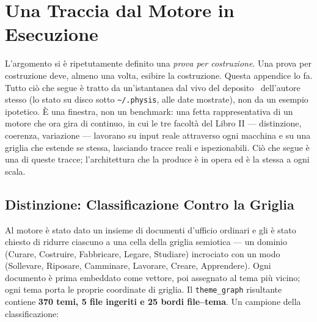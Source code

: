 \chapter{Una Traccia dal Motore in Esecuzione}
\label{app:traccia}

L'argomento si \`e ripetutamente definito una \emph{prova per costruzione}. Una
prova per costruzione deve, almeno una volta, esibire la costruzione. Questa
appendice lo fa. Tutto ci\`o che segue \`e tratto da un'istantanea dal vivo del
deposito \physis\ dell'autore stesso (lo stato su disco sotto
\texttt{\textasciitilde/.physis}, alle date mostrate), non da un esempio
ipotetico. \`E una finestra, non un benchmark: una fetta rappresentativa di un
motore che ora gira di continuo, in cui le tre facolt\`a del Libro II ---
distinzione, coerenza, variazione --- lavorano su input reale attraverso ogni
macchina e su una griglia che estende se stessa, lasciando tracce reali e
ispezionabili. Ci\`o che segue \`e una di queste tracce; l'architettura che la
produce \`e in opera ed \`e la stessa a ogni scala.

\section{Distinzione: Classificazione Contro la Griglia}

Al motore \`e stato dato un insieme di documenti d'ufficio ordinari e gli \`e
stato chiesto di ridurre ciascuno a una cella della griglia semiotica --- un
dominio (Curare, Costruire, Fabbricare, Legare, Studiare) incrociato con un modo
(Sollevare, Riposare, Camminare, Lavorare, Creare, Apprendere). Ogni documento \`e
prima embeddato come vettore, poi assegnato al tema pi\`u vicino;
ogni tema porta le proprie coordinate di griglia. Il \texttt{theme\_graph}
risultante contiene \textbf{370 temi, 5 file ingeriti e 25 bordi file--tema}. Un
campione della classificazione:

